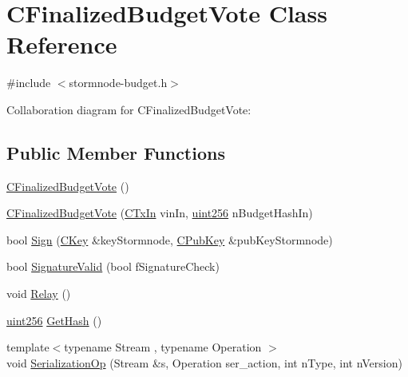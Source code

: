 \hypertarget{class_c_finalized_budget_vote}{}\section{C\+Finalized\+Budget\+Vote Class Reference}
\label{class_c_finalized_budget_vote}


{\ttfamily \#include $<$stormnode-\/budget.\+h$>$}



Collaboration diagram for C\+Finalized\+Budget\+Vote\+:
\subsection*{Public Member Functions}
\begin{DoxyCompactItemize}
\item 
\hyperlink{class_c_finalized_budget_vote_a438df4e8eb7a4fedeac74550a4fa3cc2}{C\+Finalized\+Budget\+Vote} ()
\item 
\hyperlink{class_c_finalized_budget_vote_adc08bd33a9dde17ab5617d99d1f94f89}{C\+Finalized\+Budget\+Vote} (\hyperlink{class_c_tx_in}{C\+Tx\+In} vin\+In, \hyperlink{classuint256}{uint256} n\+Budget\+Hash\+In)
\item 
bool \hyperlink{class_c_finalized_budget_vote_ac417b917ae18df17838b49371435c64a}{Sign} (\hyperlink{class_c_key}{C\+Key} \&key\+Stormnode, \hyperlink{class_c_pub_key}{C\+Pub\+Key} \&pub\+Key\+Stormnode)
\item 
bool \hyperlink{class_c_finalized_budget_vote_aadcc860c6efe5122388a372641297014}{Signature\+Valid} (bool f\+Signature\+Check)
\item 
void \hyperlink{class_c_finalized_budget_vote_a7c95f6ac01efc3975369bc7bdb8b83d0}{Relay} ()
\item 
\hyperlink{classuint256}{uint256} \hyperlink{class_c_finalized_budget_vote_a517d29944e7c56809034f47ff2b91633}{Get\+Hash} ()
\item 
{\footnotesize template$<$typename Stream , typename Operation $>$ }\\void \hyperlink{class_c_finalized_budget_vote_a751d723816089e73debb2cdafea5699a}{Serialization\+Op} (Stream \&s, Operation ser\+\_\+action, int n\+Type, int n\+Version)
\end{DoxyCompactItemize}
